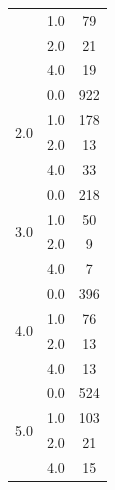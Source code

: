 \begin{longtable}{|c|c|c|c|c|}
& \multicolumn{2}{c|}{1.0} & \multicolumn{2}{c|}{79} \\
& \multicolumn{2}{c|}{2.0} & \multicolumn{2}{c|}{21} \\
& \multicolumn{2}{c|}{4.0} & \multicolumn{2}{c|}{19} \\
\hline
\multirow{4}{*}{2.0} & \multicolumn{2}{c|}{0.0} & \multicolumn{2}{c|}{922} \\
& \multicolumn{2}{c|}{1.0} & \multicolumn{2}{c|}{178} \\
& \multicolumn{2}{c|}{2.0} & \multicolumn{2}{c|}{13} \\
& \multicolumn{2}{c|}{4.0} & \multicolumn{2}{c|}{33} \\
\hline
\multirow{4}{*}{3.0} & \multicolumn{2}{c|}{0.0} & \multicolumn{2}{c|}{218} \\
& \multicolumn{2}{c|}{1.0} & \multicolumn{2}{c|}{50} \\
& \multicolumn{2}{c|}{2.0} & \multicolumn{2}{c|}{9} \\
& \multicolumn{2}{c|}{4.0} & \multicolumn{2}{c|}{7} \\
\hline
\multirow{4}{*}{4.0} & \multicolumn{2}{c|}{0.0} & \multicolumn{2}{c|}{396} \\
& \multicolumn{2}{c|}{1.0} & \multicolumn{2}{c|}{76} \\
& \multicolumn{2}{c|}{2.0} & \multicolumn{2}{c|}{13} \\
& \multicolumn{2}{c|}{4.0} & \multicolumn{2}{c|}{13} \\
\hline
\multirow{4}{*}{5.0} & \multicolumn{2}{c|}{0.0} & \multicolumn{2}{c|}{524} \\
& \multicolumn{2}{c|}{1.0} & \multicolumn{2}{c|}{103} \\
& \multicolumn{2}{c|}{2.0} & \multicolumn{2}{c|}{21} \\
& \multicolumn{2}{c|}{4.0} & \multicolumn{2}{c|}{15} \\
\hline

\end{longtable}
